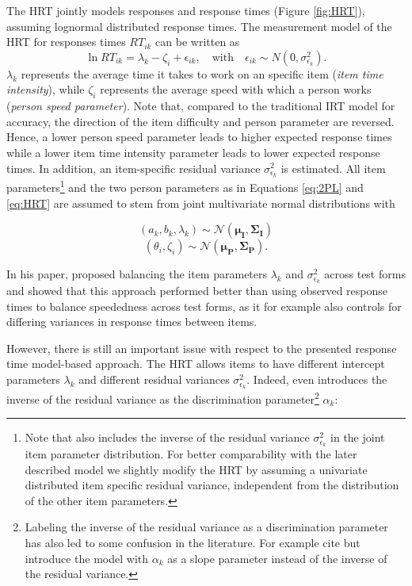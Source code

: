 \documentclass[a4paper,man,apacite,donotrepeattitle]{apa6}
\begin{document}
The HRT jointly models responses and response times (Figure \ref{fig:HRT}), assuming lognormal distributed response times. The measurement model of the HRT for responses times $RT_{ik}$ can be written as 
\begin{equation}
	\ln RT_{ik} = \lambda_{k} - \zeta_{i} + \epsilon_{ik}, 
	\quad \textrm{with} \quad \epsilon_{ik} \sim N (0, \sigma^2_{\epsilon_{k}}).
	\label{eq:HRT}
\end{equation}
$\lambda_{k}$ represents the average time it takes to work on an specific item (\textit{item time intensity}), while $\zeta_{i}$ represents the average speed with which a person works (\textit{person speed parameter}). Note that, compared to the traditional IRT model for accuracy, the direction of the item difficulty and person parameter are reversed. Hence, a lower person speed parameter leads to higher expected response times while a lower item time intensity parameter leads to lower expected response times. In addition, an item-specific residual variance $\sigma^2_{\epsilon_{k}}$ is estimated. All item parameters\footnote{Note that  also includes the inverse of the residual variance $\sigma^2_{\epsilon_{k}}$ in the joint item parameter distribution. For better comparability with the later described model we slightly modify the HRT by assuming a univariate distributed item specific residual variance, independent from the distribution of the other item parameters.} and the two person parameters as in Equations \ref{eq:2PL} and \ref{eq:HRT} are assumed to stem from joint multivariate normal distributions with

\begin{equation}
	(a_{k}, b_{k}, \lambda_{k}) \sim \mathcal{N}(\bm{\mu_{I}}, \bm{\Sigma_{I}})
	\label{eq:HRT_ItemMVN}
\end{equation}
\begin{equation}
	(\theta_{i}, \zeta_{i}) \sim \mathcal{N}(\bm{\mu_{P}}, \bm{\Sigma_{P}}).
	\label{eq:gHRT_PersonMVN}
\end{equation}
 
In his paper,  proposed balancing the item parameters $\lambda_{k}$ and $\sigma^2_{\epsilon_{k}}$ across test forms and showed that this approach performed better than using observed response times to balance speededness across test forms, as it for example also controls for differing variances in response times between items.

However, there is still an important issue with respect to the presented response time model-based approach. The HRT allows items to have different intercept parameters $\lambda_{k}$ and different residual variances $\sigma^2_{\epsilon_{k}}$. Indeed,  even introduces the inverse of the residual variance as the discrimination parameter\footnote{Labeling the inverse of the residual variance as a discrimination parameter has also led to some confusion in the literature. For example  cite  but introduce the model with $\alpha_k$ as a slope parameter instead of the inverse of the residual variance.} $\alpha_k$: 
\end{document}
